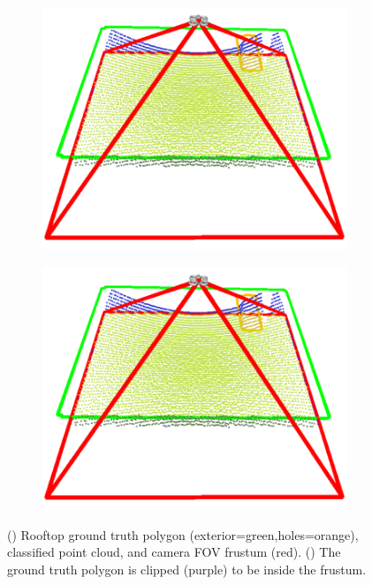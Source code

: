 \begin{figure}[ht]
 \centering
  \begin{subfigure}{.40\linewidth}
    \centering\includegraphics[page=1, width=.99\linewidth]{chapter_6_landingsim/figs/GroundTruthClipping.pdf}
    \caption{\label{fig:ch6_clipping_a}}
  \end{subfigure}
  \begin{subfigure}{.40\linewidth}
    \centering\includegraphics[page=2, width=.99\linewidth]{chapter_6_landingsim/figs/GroundTruthClipping.pdf}
    \caption{\label{fig:ch6_clipping_b}}
  \end{subfigure}
  \caption[Semantic Polylidar3D parameters]{ () Rooftop ground truth polygon (exterior=green,holes=orange), classified point cloud, and camera FOV frustum (red). () The ground truth polygon is clipped (purple) to be inside the frustum.}\label{fig:ch6_clipping}
\end{figure}



